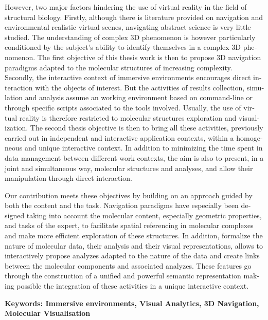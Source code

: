 \begin{otherlanguage}{english}
However, two major factors hindering the use of virtual reality in the field of structural biology. Firstly, although there is literature provided on navigation and environmental realistic virtual scenes, navigating abstract science is very little studied. The understanding of complex 3D phenomenon is however particularly conditioned by the subject's ability to identify themselves in a complex 3D phenomenon. The first objective of this thesis work is then to propose 3D navigation paradigms adapted to the molecular structures of increasing complexity. Secondly, the interactive context of immersive environments encourages direct interaction with the objects of interest. But the activities of results collection, simulation and analysis assume an working environment based on command-line or through specific scripts associated to the tools involved. Usually, the use of virtual reality is therefore restricted to molecular structures exploration and visualization. The second thesis objective is then to bring all these activities, previously carried out in independent and interactive application contexts, within a homogeneous and unique interactive context. In addition to minimizing the time spent in data management between different work contexts, the aim is also to present, in a joint and simultaneous way, molecular structures and analyses, and allow their manipulation through direct interaction.

Our contribution meets these objectives by building on an approach guided by both the content and the task. Navigation paradigms have especially been designed taking into account the molecular content, especially geometric properties, and tasks of the expert, to facilitate spatial referencing in molecular complexes and make more efficient exploration of these structures. In addition, formalize the nature of molecular data, their analysis and their visual representations, allows to interactively propose analyzes adapted to the nature of the data and create links between the molecular components and associated analyzes. These features go through the construction of a unified and powerful semantic representation making possible the integration of these activities in a unique interactive context.

\textbf{Keywords: Immersive environments, Visual Analytics, 3D Navigation, Molecular Visualisation} 

\end{otherlanguage} 